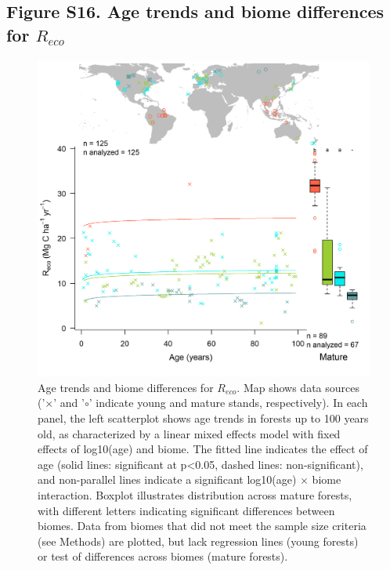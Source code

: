 \documentclass[
]{article}
\begin{document}
\newpage

\hypertarget{figure-s16.-age-trends-and-biome-differences-for-r_eco}{%
\subsection{\texorpdfstring{Figure S16. Age trends and biome differences
for
\(R_{eco}\)}{Figure S16. Age trends and biome differences for R\_\{eco\}}}\label{figure-s16.-age-trends-and-biome-differences-for-r_eco}}

\begin{figure}[H]

{\centering \includegraphics[width=1\linewidth]{tables_figures/age_trends/R_eco_with_map} 

}

\caption{Age trends and biome differences for $R_{eco}$. Map shows data sources ('$\times$' and '$\circ$' indicate young and mature stands, respectively). In each panel, the left scatterplot shows age trends in forests up to 100 years old, as characterized by a linear mixed effects model with fixed effects of log10(age) and biome. The fitted line indicates the effect of age (solid lines: significant at p<0.05, dashed lines: non-significant), and non-parallel lines indicate a significant log10(age) $\times$ biome interaction. Boxplot illustrates distribution across mature forests, with different letters indicating significant differences between biomes. Data from biomes that did not meet the sample size criteria (see Methods) are plotted, but lack regression lines (young forests) or test of differences across biomes (mature forests).}\label{fig:unnamed-chunk-19}
\end{figure}
\end{document}
